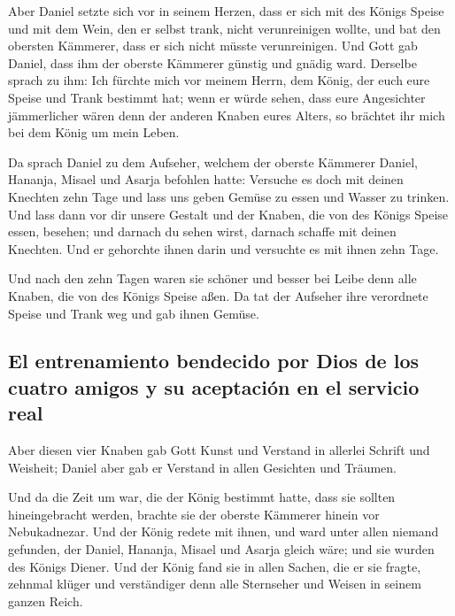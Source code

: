  Aber Daniel setzte sich vor in seinem Herzen, dass er
sich mit des Königs Speise und mit dem Wein, den er selbst trank, nicht
verunreinigen wollte, und bat den obersten Kämmerer, dass er sich nicht
müsste verunreinigen.  Und Gott gab Daniel, dass ihm der
oberste Kämmerer günstig und gnädig ward.  Derselbe
sprach zu ihm: Ich fürchte mich vor meinem Herrn, dem König, der euch
eure Speise und Trank bestimmt hat; wenn er würde sehen, dass eure
Angesichter jämmerlicher wären denn der anderen Knaben eures Alters, so
brächtet ihr mich bei dem König um mein Leben.

 Da sprach Daniel zu dem Aufseher, welchem der oberste
Kämmerer Daniel, Hananja, Misael und Asarja befohlen hatte:
 Versuche es doch mit deinen Knechten zehn Tage und lass
uns geben Gemüse zu essen und Wasser zu trinken.  Und
lass dann vor dir unsere Gestalt und der Knaben, die von des Königs
Speise essen, besehen; und darnach du sehen wirst, darnach schaffe mit
deinen Knechten.  Und er gehorchte ihnen darin und
versuchte es mit ihnen zehn Tage.

 Und nach den zehn Tagen waren sie schöner und besser bei
Leibe denn alle Knaben, die von des Königs Speise aßen. 
Da tat der Aufseher ihre verordnete Speise und Trank weg und gab ihnen
Gemüse.

\hypertarget{el-entrenamiento-bendecido-por-dios-de-los-cuatro-amigos-y-su-aceptaciuxf3n-en-el-servicio-real}{%
\subsection{El entrenamiento bendecido por Dios de los cuatro amigos y
su aceptación en el servicio
real}\label{el-entrenamiento-bendecido-por-dios-de-los-cuatro-amigos-y-su-aceptaciuxf3n-en-el-servicio-real}}

 Aber diesen vier Knaben gab Gott Kunst und Verstand in
allerlei Schrift und Weisheit; Daniel aber gab er Verstand in allen
Gesichten und Träumen.

 Und da die Zeit um war, die der König bestimmt hatte,
dass sie sollten hineingebracht werden, brachte sie der oberste Kämmerer
hinein vor Nebukadnezar.  Und der König redete mit ihnen,
und ward unter allen niemand gefunden, der Daniel, Hananja, Misael und
Asarja gleich wäre; und sie wurden des Königs Diener. 
Und der König fand sie in allen Sachen, die er sie fragte, zehnmal
klüger und verständiger denn alle Sternseher und Weisen in seinem ganzen
Reich.

